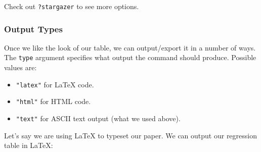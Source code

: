 \documentclass[
]{book}
\providecommand{\tightlist}{%
  \setlength{\itemsep}{0pt}\setlength{\parskip}{0pt}}
\begin{document}
Check out \texttt{?stargazer} to see more options.

\hypertarget{output-types}{%
\subsubsection*{Output Types}\label{output-types}}

Once we like the look of our table, we can output/export it in a number of ways. The \texttt{type} argument specifies what output the command should produce. Possible values are:

\begin{itemize}
\tightlist
\item
  \texttt{"latex"} for LaTeX code.
\item
  \texttt{"html"} for HTML code.
\item
  \texttt{"text"} for ASCII text output (what we used above).
\end{itemize}

Let's say we are using LaTeX to typeset our paper. We can output our regression table in LaTeX:
\end{document}

